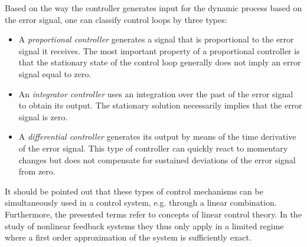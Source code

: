 \documentclass[10pt,a4paper]{article}
\begin{document}
Based on the way the controller generates input for the dynamic process based on the error signal, one can classify control loops by three types:
\newpage
\begin{itemize}
\item A \textit{proportional controller} generates a signal that is proportional to the error signal it receives. The most important property of a proportional controller is that the stationary state of the control loop generally does not imply an error signal equal to zero.
\item An \textit{integrator controller} uses an integration over the past of the error signal to obtain its output. The stationary solution necessarily implies that the error signal is zero.
\item A \textit{differential controller} generates its output by means of the time derivative of the error signal. This type of controller can quickly react to momentary changes but does not compensate for sustained deviations of the error signal from zero.
\end{itemize}
It should be pointed out that these types of control mechanisms can be simultaneously used in a control system, e.g. through a linear combination. Furthermore, the presented terms refer to concepts of linear control theory. In the study of nonlinear feedback systems they thus only apply in a limited regime where a first order approximation of the system is sufficiently exact.
\end{document}

